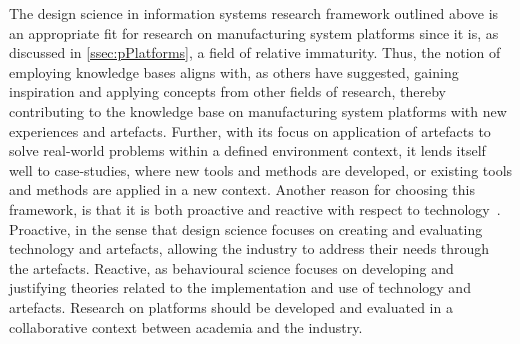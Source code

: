 The design science in information systems research framework outlined above is an appropriate fit for research on manufacturing system platforms since it is, as discussed in \cref{ssec:pPlatforms}, a field of relative immaturity.
Thus, the notion of employing knowledge bases aligns with, as others have suggested, gaining inspiration and applying concepts from other fields of research, thereby contributing to the knowledge base on manufacturing system platforms with new experiences and artefacts.
Further, with its focus on application of artefacts to solve real-world problems within a defined environment context, it lends itself well to case-studies, where new tools and methods are developed, or existing tools and methods are applied in a new context.
Another reason for choosing this framework, is that it is both proactive and reactive with respect to technology~\parencite{10.2307/25148625}.
Proactive, in the sense that design science focuses on creating and evaluating technology and artefacts, allowing the industry to address their needs through the artefacts.
Reactive, as behavioural science focuses on developing and justifying theories related to the implementation and use of technology and artefacts.
Research on platforms should be developed and evaluated in a collaborative context between academia and the industry.